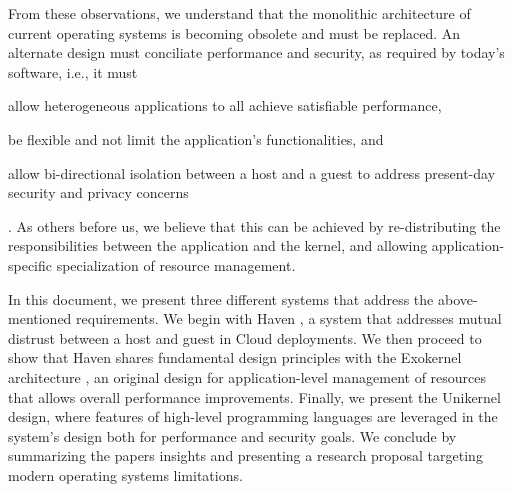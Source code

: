 From these observations, we understand that the monolithic architecture of current operating systems is becoming obsolete and must be replaced.
An alternate design must conciliate performance and security, as required by today's software, i.e., it must
\begin{enumerate*}
	\item allow heterogeneous applications to all achieve satisfiable performance,
	\item be flexible and not limit the application's functionalities, and
	\item allow bi-directional isolation between a host and a guest to address present-day security and privacy concerns
\end{enumerate*}.
As others before us\cite{DBLP:conf/sosp/EnglerKO95,DBLP:conf/hotos/EnglerK95,DBLP:conf/sosp/KaashoekEGBHMPGM97,DBLP:journals/tocs/CaoFKL96,DBLP:journals/sigops/HartyC92}, we believe that this can be achieved by re-distributing the responsibilities between the application and the kernel, and allowing application-specific specialization of resource management.

In this document, we present three different systems that address the above-mentioned requirements.
We begin with Haven \cite{DBLP:journals/tocs/BaumannPH15}, a system that addresses mutual distrust between a host and guest in Cloud deployments.
We then proceed to show that Haven shares fundamental design principles with the Exokernel architecture \cite{DBLP:conf/sosp/EnglerKO95}, an original design for application-level management of resources that allows overall performance improvements.
Finally, we present the Unikernel \cite{DBLP:conf/asplos/MadhavapeddyMRSSGSHC13} design, where features of high-level programming languages are leveraged in the system's design both for performance and security goals.
We conclude by summarizing the papers insights and presenting a research proposal targeting modern operating systems limitations.







